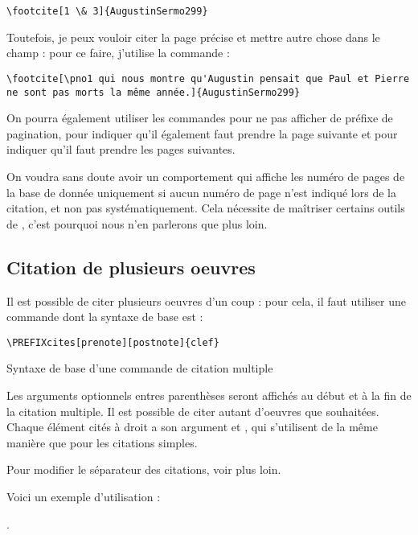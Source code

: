 \begin{verbatim}
\footcite[1 \& 3]{AugustinSermo299}
\end{verbatim}

Toutefois, je peux vouloir citer la page précise et mettre autre chose dans le champ  : pour ce faire, j'utilise la commande  :

\begin{verbatim}
\footcite[\pno1 qui nous montre qu'Augustin pensait que Paul et Pierre ne sont pas morts la même année.]{AugustinSermo299}
\end{verbatim}

On pourra également utiliser les commandes  pour ne pas afficher de préfixe de pagination,   pour indiquer qu'il également faut prendre la page suivante et  pour indiquer qu'il faut prendre les pages suivantes.

\begin{anedocte}
On voudra sans doute avoir un comportement qui affiche les numéro de pages de la base de donnée uniquement si aucun numéro de page n'est indiqué lors de la citation, et non pas systématiquement. Cela nécessite de maîtriser certains outils de , c'est pourquoi nous n'en parlerons que plus loin.
\end{anedocte}

\subsection{Citation de plusieurs oeuvres}

Il est possible de citer plusieurs oeuvres d'un coup : pour cela, il faut utiliser une commande dont la syntaxe de base est :

\begin{listing}[ht]
\begin{verbatim}
\PREFIXcites[prenote][postnote]{clef}
\end{verbatim}
\caption{Syntaxe de base d'une commande de citation multiple}
\end{listing}
Les arguments optionnels entres parenthèses seront affichés au début et à la fin de la citation multiple. Il est possible de citer autant d'oeuvres que souhaitées. Chaque élément cités à droit a son argument  et , qui s'utilisent de la même manière que pour les citations simples.

\begin{anedocte}
Pour modifier le séparateur des citations, voir plus loin.
\end{anedocte}

Voici un exemple d'utilisation : 

.

